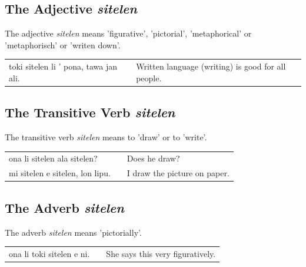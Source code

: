 %
\subsection*{The Adjective \textit{sitelen}}
%
%
The adjective \textit{sitelen} means 'figurative', 'pictorial', 'metaphorical' or 'metaphorisch' or 'writen down'.

\begin{supertabular}{p{5,5cm}|ll}
    toki sitelen li ' pona, tawa jan ali. &  & Written language (writing) is good for all people. \\
\end{supertabular}

%
\subsection*{The Transitive Verb \textit{sitelen}}
%
%
The transitive verb \textit{sitelen} means to 'draw' or to 'write'.

\begin{supertabular}{p{5,5cm}|ll}
    ona li sitelen ala sitelen?     &  & Does he draw?                \\
    mi sitelen e sitelen, lon lipu. &  & I draw the picture on paper. \\
\end{supertabular}

%
\subsection*{The Adverb \textit{sitelen}}
%
%
The adverb \textit{sitelen} means 'pictorially'.

\begin{supertabular}{p{5,5cm}|ll}
    ona li toki sitelen e ni. &  & She says this very figuratively. \\
\end{supertabular}

%
\newpage
%

